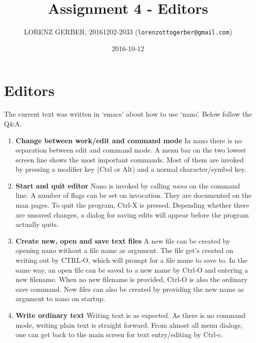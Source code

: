 \documentclass[a4paper,11pt,twoside]{article}
\title{Assignment 4 - Editors}
\author{LORENZ GERBER, 20161202-2033 ({\tt{lorenzottogerber@gmail.com}})}
\date{2016-10-12}
\begin{document}
\lstset{language=C}
\maketitle
\thispagestyle{empty}
\newpage

\clearpage
{}

\section{Editors}
The current text was written in `emacs' about how to use `nano'. Below follow the Q\&A.

\begin{enumerate}

\item \textbf{Change between work/edit and command mode} In nano there is no separation between edit and command mode. A menu bar on the two lowest screen line shows the most important commands. Most of them are invoked by pressing a modifier key (Ctrl or Alt) and a normal character/symbol key. 
  

\item \textbf{Start and quit editor} Nano is invoked by calling \textit{nano} on the command line. A number of flags can be set on invocation. They are documented on the man pages. To quit the program, Ctrl-X is pressed. Depending whether there are unsaved changes, a dialog for saving edits will appear before the program actually quits.  

\item \textbf{Create new, open and save text files}
  A new file can be created by opening nano without a file name as argument. The file get's created on writing out by CTRL-O, which will prompt for a file name to save to. In the same way, an open file can be saved to a new name by Ctrl-O and entering a new filename. When no new filename is provided, Ctrl-O is also the ordinary save command. New files can also be created by providing the new name as argument to nano on startup. 

  
\item \textbf{Write ordinary text} Writing text is as expected. As there is no command mode, writing plain text is straight forward. From almost all menu dialogs, one can get back to the main screen for text entry/editing by Ctrl-c. 
  

\end{enumerate}
\end{document}
